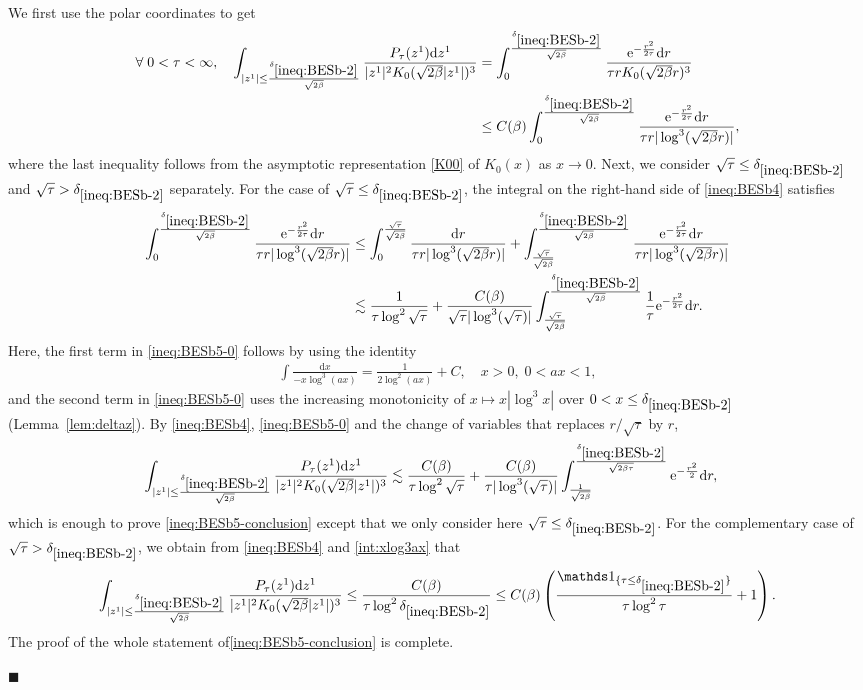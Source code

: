 \documentclass[12pt, twoside]{article}
\numberwithin{figure}{section}
\newcommand{\less}{\lesssim}
\newcommand{\e}{{\mathrm e}}
\newcommand{\1}{\mathds 1}
\renewcommand{\d}{{\mathrm d}}
\newcommand{\2}{{\mathbf 1}}
\renewenvironment{proof}[1][\proofname]{\noindent {\bfseries #1.}\;}{\hfill\ensuremath{\blacksquare}\\}
\newcommand{\cc}{{^\circ}}
\newcommand{\deltaz}{\delta_{\ref{ineq:BESb-2}}}
\begin{document}
\begin{proof}[Proof of Proposition~\ref{prop:BESmom} (1$\cc$)]
We first use the polar coordinates to get
\begin{align}
\forall\;0<\tau<\infty,\quad \int_{|z^1|\leq \frac{\deltaz}{\sqrt{2\beta}}} \frac{P_{\tau}(z^1)\d z^1}{|z^1|^2 K_0(\sqrt{2\beta}|z^1|)^3}
&=
\int_{0}^{\frac{\deltaz}{\sqrt{2\beta}}} \frac{\e^{-\frac{r^2}{2\tau}}\d r}{\tau rK_0(\sqrt{2\beta}r)^3}\notag\\
&\leq C(\beta) \int_{0}^{\frac{\deltaz}{\sqrt{2\beta}}} \frac{\e^{-\frac{r^2}{2\tau}}\d r}{\tau r|\log^3 (\sqrt{2\beta} r)|},
\label{ineq:BESb4}
\end{align}
where the last inequality follows from the asymptotic representation \eqref{K00} of $K_0(x)$ as $x\to 0$.
Next, we consider $\sqrt{\tau}\leq \deltaz$ and $\sqrt{\tau}> \deltaz$ separately. For the case of $\sqrt{\tau}\leq \deltaz$, the integral on the right-hand side of \eqref{ineq:BESb4} satisfies  
\begin{align}
\int_{0}^{\frac{\deltaz}{\sqrt{2\beta}}} \frac{\e^{-\frac{r^2}{2\tau}}\d r}{\tau r|\log^3 (\sqrt{2\beta} r)|}
&\leq \int_{0}^{\frac{\sqrt{\tau}}{\sqrt{2\beta}}} \frac{\d r}{\tau r|\log^3 (\sqrt{2\beta} r)|}+\int_{\frac{\sqrt{\tau}}{\sqrt{2\beta}}}^{\frac{\deltaz}{\sqrt{2\beta}}}\frac{\e^{-\frac{r^2}{2\tau}}\d r}{\tau r|\log^3 (\sqrt{2\beta} r)|}\notag\\
&\less\frac{1}{\tau\log^2\sqrt{\tau} }+\frac{C(\beta)}{\sqrt{\tau}|\log^3 (\sqrt{ \tau})|}\int_{\frac{\sqrt{\tau}}{\sqrt{2\beta}}}^{\frac{\deltaz}{\sqrt{2\beta}}}\frac{1}{\tau}\e^{-\frac{r^2}{2\tau}}\d r.\label{ineq:BESb5-0}
\end{align}
Here, the first term in \eqref{ineq:BESb5-0} follows by using 
the identity 
\begin{align}\label{int:xlog3ax}
\int \frac{\d x}{-x\log^3(ax)}=\frac{1}{2\log^2(ax)}+C,\quad x>0,\;0<ax<1,
\end{align}
and the second term in \eqref{ineq:BESb5-0} uses the increasing monotonicity of $x\mapsto x|\log^3x|$ over $0<x\leq \deltaz$ (Lemma~\ref{lem:deltaz}). By \eqref{ineq:BESb4}, \eqref{ineq:BESb5-0} and the change of variables that replaces $r/\sqrt{\tau}$ by $r$, 
\begin{align}
\int_{|z^1|\leq \frac{\deltaz}{\sqrt{2\beta}}} \frac{P_{\tau}(z^1)\d z^1}{|z^1|^2 K_0(\sqrt{2\beta}|z^1|)^3}
&\less\frac{C(\beta)}{\tau\log^2\sqrt{\tau} }+\frac{C(\beta)}{\tau|\log^3 (\sqrt{ \tau})|}\int_{\frac{1}{\sqrt{2\beta}}}^{\frac{\deltaz}{\sqrt{2\beta \tau}}} \e^{-\frac{r^2}{2}}\d r,\notag
\end{align}
which is enough to prove \eqref{ineq:BESb5-conclusion} except that we only consider here $\sqrt{\tau}\leq \deltaz$. For the complementary case of $\sqrt{\tau}> \deltaz$,
we obtain from \eqref{ineq:BESb4} and \eqref{int:xlog3ax} that
\[
\int_{|z^1|\leq \frac{\deltaz}{\sqrt{2\beta}}} \frac{P_{\tau}(z^1)\d z^1}{|z^1|^2 K_0(\sqrt{2\beta}|z^1|)^3}\leq \frac{C(\beta)}{\tau\log^2\deltaz}\leq C(\beta)\left(\frac{\1_{\{ \tau\leq \deltaz\}}}{\tau\log^2 \tau }+1\right).
\] 
The proof of  the whole statement of\eqref{ineq:BESb5-conclusion} is complete. \smallskip


\end{proof}
\end{document}
